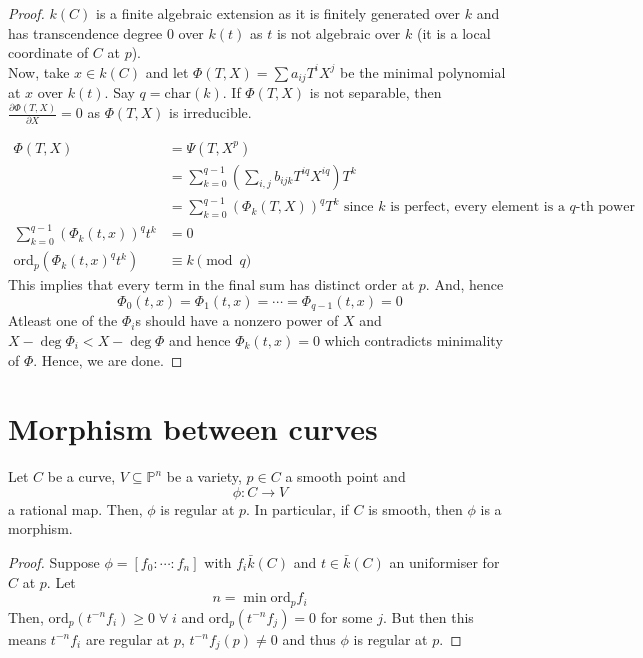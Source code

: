 \documentclass[oneside, 12pt, ]{scrbook}
\newcommand{\PP}{\mathbb{P}}
\newcommand{\ord}{\mathrm{ord}}
\theoremstyle{theorem}
\begin{document}
\begin{proof}
$k(C)$ is a finite algebraic extension as it is finitely generated over $k$ and has transcendence degree $0$ over $k(t)$ as $t$ is not algebraic over $k$ (it is a local coordinate of $C$ at $p$). \\

Now, take $x\in k(C)$ and let $\Phi(T,X) = \sum a_{ij}T^{i}X^{j}$ be the minimal polynomial at $x$ over $k(t)$. Say $q = \mathrm{char}(k)$. If $\Phi (T,X)$ is not separable, then $\frac{\partial \Phi(T,X)}{\partial X} = 0$ as $\Phi(T,X)$ is irreducible. 

\begin{align*}
\Phi(T,X) &= \Psi (T,X^p) \\
&= \sum_{k=0}^{q-1} \left( \sum_{i,j} b_{ijk} T^{iq} X^{iq} \right) T^k \\
&= \sum_{k=0}^{q-1} \left( \Phi_{k}(T,X) \right)^q T^k \text{     since $k$ is perfect, every element is a $q$-th power} \\
\sum_{k=0}^{q-1} \left( \Phi_{k}(t,x) \right)^q t^k &=0\\
\ord_{p} (\Phi_{k}(t,x)^q t^k) &\equiv k \pmod{q}
\end{align*}
This implies that every term in the final sum has distinct order at $p$. And, hence $$\Phi_{0}(t,x) = \Phi_{1}(t,x) = \cdots = \Phi_{q-1}(t,x) = 0$$ Atleast one of the $\Phi_{i}$s should have a nonzero power of $X$ and $X - \deg \Phi_{i} < X - \deg \Phi$ and hence $\Phi_{k}(t,x) =0$ which contradicts minimality of $\Phi$. Hence, we are done.
\end{proof}

\section{Morphism between curves}

\begin{proposition}
Let $C$ be a curve, $V \subseteq \PP^n$ be a variety, $p \in C$ a smooth point and $$\phi : C \rightarrow V$$ a rational map. Then, $\phi$ is regular at $p$. In particular, if $C$ is smooth, then $\phi$ is a morphism.
\end{proposition}

\begin{proof}
Suppose $\phi = [f_{0} : \cdots : f_{n}]$ with $f_{i} \bar{k}(C)$ and $t \in \bar{k}(C)$ an uniformiser for $C$ at $p$. Let $$n = \min \ord_{p} f_{i}$$ Then, $\ord_{p}(t^{-n}f_{i}) \geq 0 \; \forall \; i$ and $\ord_{p}(t^{-n}f_{j})=0$ for some $j$. But then this means $t^{-n}f_{i}$ are regular at $p$, $t^{-n}f_{j}(p) \neq 0$ and thus $\phi$ is regular at $p$.
\end{proof}
\end{document}
